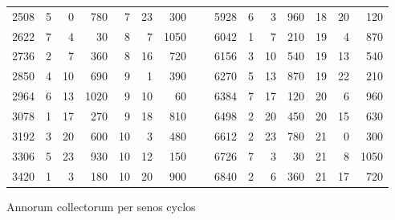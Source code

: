 \begin{tabular}[c]{@{} r rrr rrr c r rrr rrr@{}}
2508& 5& ~0&  780&  7& 23&  300 &~& 5928& 6& ~3&  960& 18& 20&  120\\
2622& 7& ~4&   30&  8& ~7& 1050 &~& 6042& 1& ~7&  210& 19& ~4&  870\\
2736& 2& ~7&  360&  8& 16&  720 &~& 6156& 3& 10&  540& 19& 13&  540\\
2850& 4& 10&  690&  9& ~1&  390 &~& 6270& 5& 13&  870& 19& 22&  210\\
2964& 6& 13& 1020&  9& 10&   60 &~& 6384& 7& 17&  120& 20& ~6&  960\\
3078& 1& 17&  270&  9& 18&  810 &~& 6498& 2& 20&  450& 20& 15&  630\\
3192& 3& 20&  600& 10& ~3&  480 &~& 6612& 2& 23&  780& 21& ~0&  300\\
3306& 5& 23&  930& 10& 12&  150 &~& 6726& 7& ~3&   30& 21& ~8& 1050\\
3420& 1& ~3&  180& 10& 20&  900 &~& 6840& 2& ~6&  360& 21& 17&  720\\
\bottomrule
\end{tabular}
\caption{Annorum collectorum per senos cyclos}
\label{tab:p129a}
\endgroup
